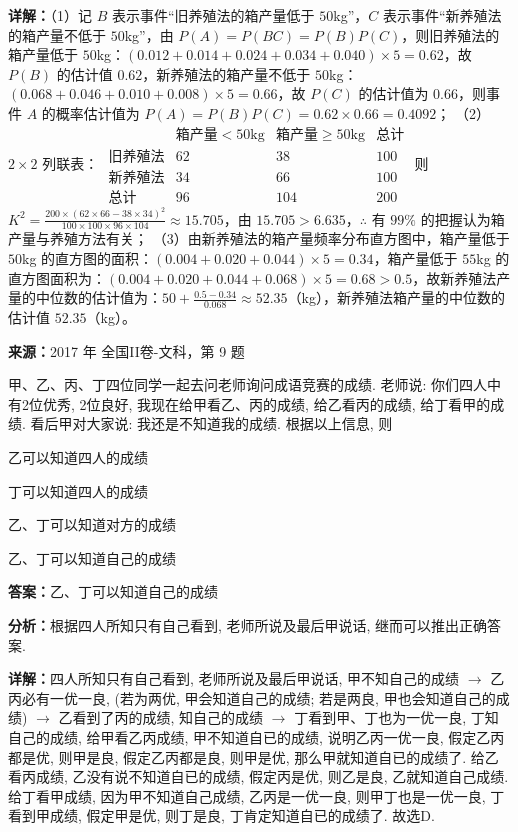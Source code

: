\begin{question}[points=12]
\begin{solution}
\textbf{详解：}（1）记 $B$ 表示事件“旧养殖法的箱产量低于 $50$kg”，$C$ 表示事件“新养殖法的箱产量不低于 $50$kg”，由 $P(A)=P(BC)=P(B)P(C)$，则旧养殖法的箱产量低于 $50$kg：$(0.012+0.014+0.024+0.034+0.040)\times5=0.62$，故 $P(B)$ 的估计值 $0.62$，新养殖法的箱产量不低于 $50$kg：$(0.068+0.046+0.010+0.008)\times5=0.66$，故 $P(C)$ 的估计值为 $0.66$，则事件 $A$ 的概率估计值为 $P(A)=P(B)P(C)=0.62\times0.66=0.4092$；
（2）$2\times2$ 列联表：
$\begin{array}{c|cc|c} & \text{箱产量}<50\text{kg} & \text{箱产量}\ge50\text{kg} & \text{总计} \\ \hline \text{旧养殖法} & 62 & 38 & 100 \\ \text{新养殖法} & 34 & 66 & 100 \\ \hline \text{总计} & 96 & 104 & 200 \end{array}$
则 $K^2=\frac{200\times(62\times66-38\times34)^2}{100\times100\times96\times104}\approx15.705$，由 $15.705>6.635$，$\therefore$ 有 $99\%$ 的把握认为箱产量与养殖方法有关；
（3）由新养殖法的箱产量频率分布直方图中，箱产量低于 $50$kg 的直方图的面积：$(0.004+0.020+0.044)\times5=0.34$，箱产量低于 $55$kg 的直方图面积为：$(0.004+0.020+0.044+0.068)\times5=0.68>0.5$，故新养殖法产量的中位数的估计值为：$50+\frac{0.5-0.34}{0.068}\approx52.35$（kg），新养殖法箱产量的中位数的估计值 $52.35$（kg）。
\end{solution}
\end{question}

\begin{question}[points=5]
\textbf{来源：}2017 年 全国II卷-文科，第 9 题\par
甲、乙、丙、丁四位同学一起去问老师询问成语竞赛的成绩. 老师说: 你们四人中有2位优秀, 2位良好, 我现在给甲看乙、丙的成绩, 给乙看丙的成绩, 给丁看甲的成绩. 看后甲对大家说: 我还是不知道我的成绩. 根据以上信息, 则
\begin{choices}
  \item 乙可以知道四人的成绩
  \item 丁可以知道四人的成绩
  \item 乙、丁可以知道对方的成绩
  \item 乙、丁可以知道自己的成绩
\end{choices}
\begin{solution}
\textbf{答案：}乙、丁可以知道自己的成绩

\textbf{分析：}根据四人所知只有自己看到, 老师所说及最后甲说话, 继而可以推出正确答案.

\textbf{详解：}四人所知只有自己看到, 老师所说及最后甲说话, 甲不知自己的成绩 $\rightarrow$ 乙丙必有一优一良, (若为两优, 甲会知道自己的成绩; 若是两良, 甲也会知道自己的成绩) $\rightarrow$ 乙看到了丙的成绩, 知自己的成绩 $\rightarrow$ 丁看到甲、丁也为一优一良, 丁知自己的成绩, 给甲看乙丙成绩, 甲不知道自已的成绩, 说明乙丙一优一良, 假定乙丙都是优, 则甲是良, 假定乙丙都是良, 则甲是优, 那么甲就知道自已的成绩了. 给乙看丙成绩, 乙没有说不知道自已的成绩, 假定丙是优, 则乙是良, 乙就知道自己成绩. 给丁看甲成绩, 因为甲不知道自己成绩, 乙丙是一优一良, 则甲丁也是一优一良, 丁看到甲成绩, 假定甲是优, 则丁是良, 丁肯定知道自已的成绩了. 故选D.
\end{solution}
\end{question}

